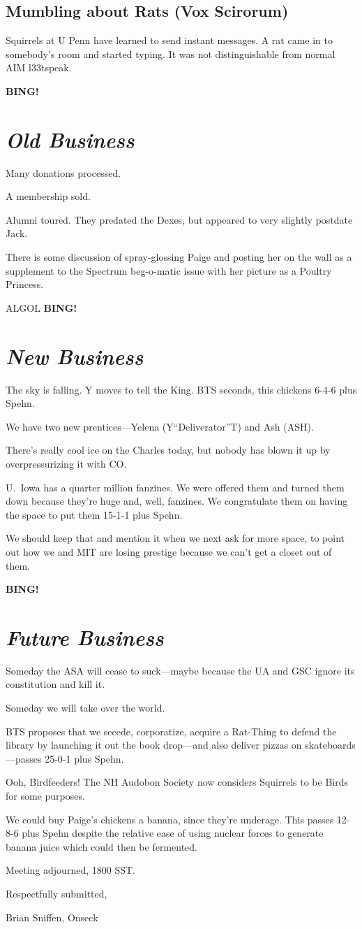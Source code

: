 \documentclass[10pt]{article}
\newcommand{\bing}{{\bf BING!} }
\newcommand{\goto}[1]{\bing \vskip 12pt \section*{{\em{#1}}}}
\newcommand{\ps}{ plus Spehn\xspace}
\begin{document}
\subsection*{Mumbling about Rats (Vox Scirorum)}
Squirrels at U Penn have learned to send instant messages.  A rat came
in to somebody's room and started typing.  It was not distinguishable
from normal AIM l33tspeak.

\goto{Old Business}
Many donations processed.

A membership sold.

Alumni toured.  They predated the Dexes, but appeared to very slightly
postdate Jack.

There is some discussion of spray-glossing Paige and posting her on
the wall as a supplement to the Spectrum beg-o-matic issue with her
picture as a Poultry Princess.

ALGOL
\goto{New Business}

The sky is falling.  Y moves to tell the King.  BTS seconds, this
chickens 6-4-6\ps.

We have two new prentices---Yelena (Y``Deliverator''T) and Ash (ASH).

There's really cool ice on the Charles today, but nobody has blown it
up by overpressurizing it with CO.

U.~Iowa has a quarter million fanzines.  We were offered them and
turned them down because they're huge and, well, fanzines.  We
congratulate them on having the space to put them 15-1-1\ps.

We should keep that and mention it when we next ask for more space, to
point out how we and MIT are losing prestige because we can't get a
closet out of them.

\goto{Future Business}
Someday the ASA will cease to suck---maybe because the UA and GSC
ignore its constitution and kill it.

Someday we will take over the world.

BTS proposes that we secede, corporatize, acquire a Rat-Thing to
defend the library by launching it out the book drop---and also
deliver pizzas on skateboards---passes 25-0-1\ps.

Ooh, Birdfeeders!  The NH Audobon Society now considers Squirrels to
be Birds for some purposes.

We could buy Paige's chickens a banana, since they're underage.  This
passes 12-8-6\ps despite the relative ease of using nuclear forces to generate
banana juice which could then be fermented.

\vspace{12pt}

\noindent
Meeting adjourned, 1800 SST.

\vspace{18pt}

\centerline{Respectfully submitted,}
\centerline{Brian Sniffen, Onseck}
\end{document}

